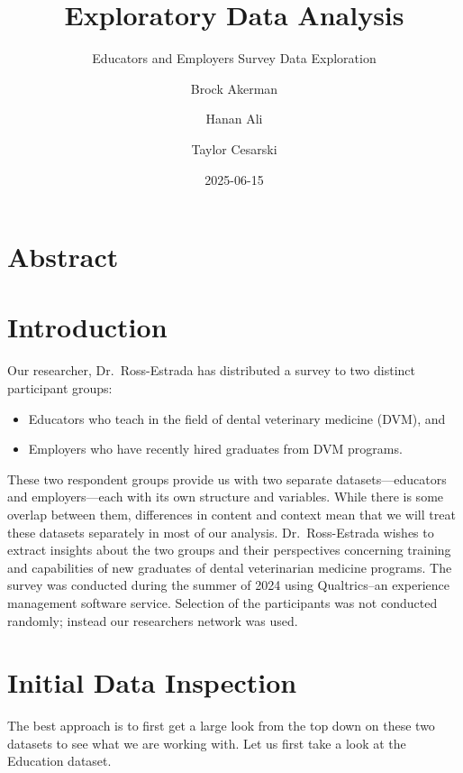 \documentclass[
  11pt,
  letterpaper,
  DIV=11,
  numbers=noendperiod]{scrartcl}
\title{Exploratory Data Analysis}
\subtitle{Educators and Employers Survey Data Exploration}
\author{Brock Akerman \and Hanan Ali \and Taylor Cesarski}
\date{2025-06-15}
\renewcommand*\contentsname{Table of contents}
\newcommand\contentsname{Table of contents}
\begin{document}
\maketitle

\renewcommand*\contentsname{Table of contents}
{
\hypersetup{linkcolor=}
\setcounter{tocdepth}{2}
\tableofcontents
}

\newpage

\section{Abstract}\label{abstract}

\section{Introduction}\label{introduction}

Our researcher, Dr.~Ross-Estrada has distributed a survey to two
distinct participant groups:

\begin{itemize}
\item
  Educators who teach in the field of dental veterinary medicine (DVM),
  and
\item
  Employers who have recently hired graduates from DVM programs.
\end{itemize}

These two respondent groups provide us with two separate
datasets---educators and employers---each with its own structure and
variables. While there is some overlap between them, differences in
content and context mean that we will treat these datasets separately in
most of our analysis. Dr.~Ross-Estrada wishes to extract insights about
the two groups and their perspectives concerning training and
capabilities of new graduates of dental veterinarian medicine programs.
The survey was conducted during the summer of 2024 using Qualtrics--an
experience management software service. Selection of the participants
was not conducted randomly; instead our researchers network was used.

\section{Initial Data Inspection}\label{initial-data-inspection}

The best approach is to first get a large look from the top down on
these two datasets to see what we are working with. Let us first take a
look at the Education dataset.
\end{document}
